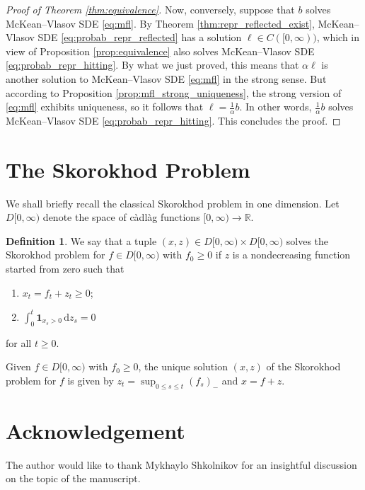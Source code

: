 \documentclass[11pt, a4paper]{article}
\theoremstyle{plain}
\theoremstyle{definition}
\newtheorem{definition}[theorem]{Definition}
\theoremstyle{remark}
\numberwithin{equation}{section}
\newcommand{\R}{\mathbb{R}}
\renewcommand{\d}{\mathrm{d}}
\renewcommand{\bf}[1]{\mathbf{#1}}
\begin{document}
\begin{proof}[Proof of Theorem \ref{thm:equivalence}]
Now, conversely, suppose that $b$ solves McKean--Vlasov SDE \eqref{eq:mfl}. By Theorem \ref{thm:repr_reflected_exist}, McKean--Vlasov SDE \eqref{eq:probab_repr_reflected} has a solution $\ell \in C([0, \infty))$, which in view of Proposition \ref{prop:equivalence} also solves McKean--Vlasov SDE \eqref{eq:probab_repr_hitting}. By what we just proved, this means that $\alpha \ell$ is another solution to McKean--Vlasov SDE \eqref{eq:mfl} in the strong sense. But according to Proposition \ref{prop:mfl_strong_uniqueness}, the strong version of \eqref{eq:mfl} exhibits uniqueness, so it follows that $\ell = \frac{1}{\alpha} b$. In other words, $\frac{1}{\alpha} b$ solves McKean--Vlasov SDE \eqref{eq:probab_repr_hitting}. This concludes the proof.
\end{proof}

\appendix

\section{The Skorokhod Problem} \label{sec:skorokhod_problem}

We shall briefly recall the classical Skorokhod problem in one dimension. Let $D[0, \infty)$ denote the space of c\`adl\`ag functions $[0, \infty) \to \R$.

\begin{definition} \label{def:skorokhod_problem}
We say that a tuple $(x, z) \in D[0, \infty) \times D[0, \infty)$ solves the Skorokhod problem for $f \in D[0, \infty)$ with $f_0 \geq 0$ if $z$ is a nondecreasing function started from zero such that
\begin{enumerate}[noitemsep, label = (\roman*)]
    \item $x_t = f_t + z_t \geq 0$;
    \item $\int_0^t \bf{1}_{x_s > 0} \, \d z_s = 0$
\end{enumerate}
for all $t \geq 0$.
\end{definition}

Given $f \in D[0, \infty)$ with $f_0 \geq 0$, the unique solution $(x, z)$ of the Skorokhod problem for $f$ is given by $z_t = \sup_{0 \leq s \leq t} (f_s)_-$ and $x = f + z$.


\section*{Acknowledgement}
The author would like to thank Mykhaylo Shkolnikov for an insightful discussion on the topic of the manuscript.

\sloppypar
\printbibliography
\end{document}
